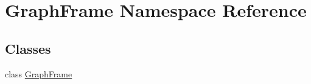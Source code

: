 \hypertarget{namespaceGraphFrame}{
\section{GraphFrame Namespace Reference}
\label{namespaceGraphFrame}
}
\subsection*{Classes}
\begin{DoxyCompactItemize}
\item 
class \hyperlink{classGraphFrame_1_1GraphFrame}{GraphFrame}
\end{DoxyCompactItemize}
